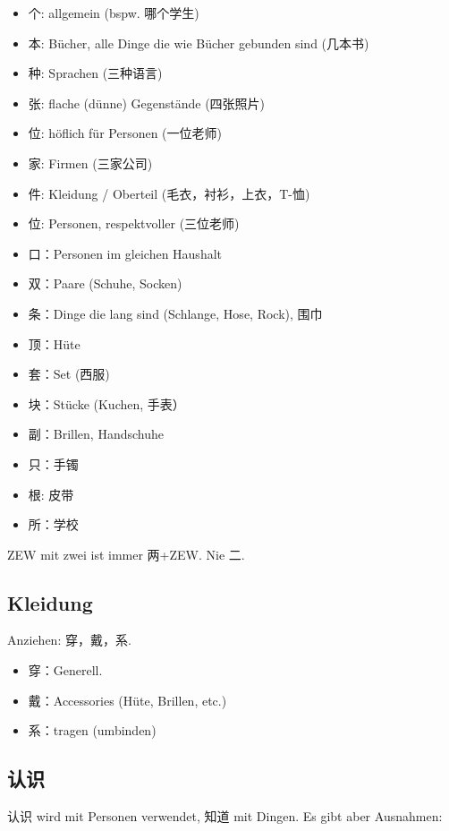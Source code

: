 \documentclass[UTF8]{ctexart}
\begin{document}
\begin{itemize}
    \item 个: allgemein (bspw. 哪个学生)
    \item 本: Bücher, alle Dinge die wie Bücher gebunden sind (几本书)
    \item 种: Sprachen (三种语言)
    \item 张: flache (dünne) Gegenstände (四张照片)
    \item 位: höflich für Personen (一位老师)
    \item 家: Firmen (三家公司)
    \item 件: Kleidung / Oberteil (毛衣，衬衫，上衣，T-恤)
    \item 位: Personen, respektvoller (三位老师)
    \item 口：Personen im gleichen Haushalt
    \item 双：Paare (Schuhe, Socken)
    \item 条：Dinge die lang sind (Schlange, Hose, Rock), 围巾
    \item 顶：Hüte
    \item 套：Set (西服)
    \item 块：Stücke (Kuchen, 手表）
    \item 副：Brillen, Handschuhe
    \item 只：手镯
    \item 根: 皮带
    \item 所：学校
\end{itemize}

ZEW mit zwei ist immer 两+ZEW. Nie 二.

\subsection{Kleidung}

Anziehen: 穿，戴，系.

\begin{itemize}
    \item 穿：Generell.
    \item 戴：Accessories (Hüte, Brillen, etc.)
    \item 系：tragen (umbinden)
\end{itemize}

\subsection{认识}

认识 wird mit Personen verwendet, 知道 mit Dingen. Es gibt aber Ausnahmen:
\end{document}
